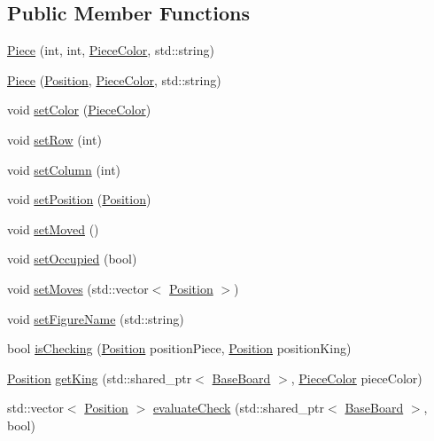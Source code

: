 \subsection*{Public Member Functions}
\begin{DoxyCompactItemize}
\item 
\hyperlink{class_piece_a2975fad91c5ef37d678a22253d37548f}{Piece} (int, int, \hyperlink{_piece_8h_ad7595c48bb74c0dd2a7648712a2d4985}{Piece\+Color}, std\+::string)
\item 
\hyperlink{class_piece_a99ebd588613d69a9aa7896240f810308}{Piece} (\hyperlink{struct_position}{Position}, \hyperlink{_piece_8h_ad7595c48bb74c0dd2a7648712a2d4985}{Piece\+Color}, std\+::string)
\item 
void \hyperlink{class_piece_a5b8c0f65eb850c91ae148501cd15adbf}{set\+Color} (\hyperlink{_piece_8h_ad7595c48bb74c0dd2a7648712a2d4985}{Piece\+Color})
\item 
void \hyperlink{class_piece_a604cbeae62b4358425d046bc5d737a39}{set\+Row} (int)
\item 
void \hyperlink{class_piece_a826ba56a44a5bf2e1ecdea849f2581d3}{set\+Column} (int)
\item 
void \hyperlink{class_piece_a459865f830ff8c199cfca49f5d89b806}{set\+Position} (\hyperlink{struct_position}{Position})
\item 
void \hyperlink{class_piece_a0ff1ca92370da533f6ef421dc09741f8}{set\+Moved} ()
\item 
void \hyperlink{class_piece_aad0fbfd687db57c60b5b4585b67f387d}{set\+Occupied} (bool)
\item 
void \hyperlink{class_piece_ad63e838ac5edfe8abab7211fc79e5a82}{set\+Moves} (std\+::vector$<$ \hyperlink{struct_position}{Position} $>$)
\item 
void \hyperlink{class_piece_a16971e1511ab403ede566b4fdbbab8a8}{set\+Figure\+Name} (std\+::string)
\item 
bool \hyperlink{class_piece_aa45b0c7c5552437dfd9d4567d2c7e7dd}{is\+Checking} (\hyperlink{struct_position}{Position} position\+Piece, \hyperlink{struct_position}{Position} position\+King)
\item 
\hyperlink{struct_position}{Position} \hyperlink{class_piece_a8537f9ebe9b135e3e5da99f385a90042}{get\+King} (std\+::shared\+\_\+ptr$<$ \hyperlink{class_base_board}{Base\+Board} $>$, \hyperlink{_piece_8h_ad7595c48bb74c0dd2a7648712a2d4985}{Piece\+Color} piece\+Color)
\item 
std\+::vector$<$ \hyperlink{struct_position}{Position} $>$ \hyperlink{class_piece_a0769c700d680b8036002c0427b7ac559}{evaluate\+Check} (std\+::shared\+\_\+ptr$<$ \hyperlink{class_base_board}{Base\+Board} $>$, bool)

\end{DoxyCompactItemize}
